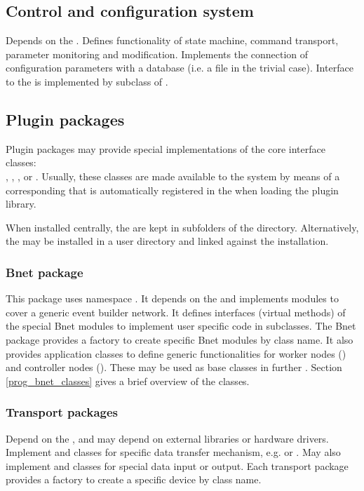 \subsection{Control and configuration system}
   Depends on the . Defines 
   functionality of state machine, command transport, parameter 
   monitoring and modification. Implements the 
   connection of configuration parameters with a database 
   (i.e. a file in the trivial case). Interface to the  is 
   implemented by subclass of .

                
\subsection{Plugin packages}
Plugin packages may provide special implementations of the core interface classes: \\
, , , or
. Usually, these classes are made available to the system by means
of a corresponding  that is automatically registered in the  
when loading the plugin library.

When installed centrally, the  are kept in subfolders of the   directory.
Alternatively, the  may be installed in a user directory and linked against the
 installation.

\subsubsection{Bnet package}
   This package uses namespace . It depends on the  and implements 
   modules to cover a generic event builder network. 
   It defines interfaces (virtual methods) of the special Bnet modules to 
   implement user specific code in subclasses. The Bnet package provides a 
   factory to create specific Bnet modules by class name. It also 
   provides application classes to define generic functionalities for 
   worker nodes () and 
   controller nodes (). These may be used as base classes
   in further .
   Section \ref{prog_bnet_classes} gives a brief overview of the
 classes.   
   
\subsubsection{Transport packages}
   Depend on the , and may depend on external libraries or hardware drivers. 
   Implement  and 
    classes for specific data transfer mechanism, e.g. 
    or . May also implement  
   and  classes for special data input or output. Each transport package provides a 
   factory to create a specific device by class name. 
   
